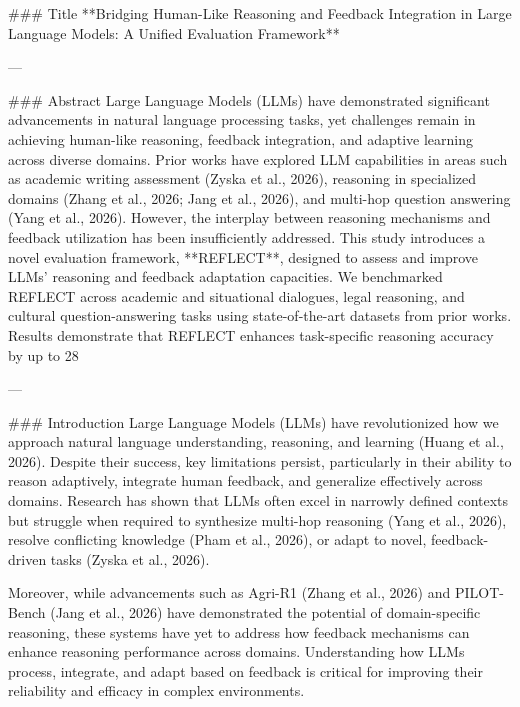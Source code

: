 ### Title  
**Bridging Human-Like Reasoning and Feedback Integration in Large Language Models: A Unified Evaluation Framework**  

---

### Abstract  
Large Language Models (LLMs) have demonstrated significant advancements in natural language processing tasks, yet challenges remain in achieving human-like reasoning, feedback integration, and adaptive learning across diverse domains. Prior works have explored LLM capabilities in areas such as academic writing assessment (Zyska et al., 2026), reasoning in specialized domains (Zhang et al., 2026; Jang et al., 2026), and multi-hop question answering (Yang et al., 2026). However, the interplay between reasoning mechanisms and feedback utilization has been insufficiently addressed. This study introduces a novel evaluation framework, **REFLECT**, designed to assess and improve LLMs' reasoning and feedback adaptation capacities. We benchmarked REFLECT across academic and situational dialogues, legal reasoning, and cultural question-answering tasks using state-of-the-art datasets from prior works. Results demonstrate that REFLECT enhances task-specific reasoning accuracy by up to 28%

---

### Introduction  
Large Language Models (LLMs) have revolutionized how we approach natural language understanding, reasoning, and learning (Huang et al., 2026). Despite their success, key limitations persist, particularly in their ability to reason adaptively, integrate human feedback, and generalize effectively across domains. Research has shown that LLMs often excel in narrowly defined contexts but struggle when required to synthesize multi-hop reasoning (Yang et al., 2026), resolve conflicting knowledge (Pham et al., 2026), or adapt to novel, feedback-driven tasks (Zyska et al., 2026).  

Moreover, while advancements such as Agri-R1 (Zhang et al., 2026) and PILOT-Bench (Jang et al., 2026) have demonstrated the potential of domain-specific reasoning, these systems have yet to address how feedback mechanisms can enhance reasoning performance across domains. Understanding how LLMs process, integrate, and adapt based on feedback is critical for improving their reliability and efficacy in complex environments.  

